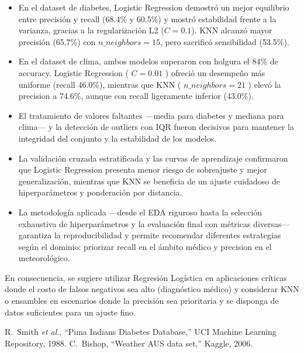 \documentclass[journal]{IEEEtran}
\begin{document}
\begin{itemize}
  \item En el dataset de diabetes, Logistic Regression demostró un mejor equilibrio entre precisión y recall (68.4\% y 60.5\%) y mostró estabilidad frente a la varianza, gracias a la regularización L2 (\(C=0.1\)). KNN alcanzó mayor precisión (65.7\%) con \(n\_neighbors=15\), pero sacrificó sensibilidad (53.5\%).
  \item En el dataset de clima, ambos modelos superaron con holgura el 84\% de accuracy. Logistic Regression ( \(C=0.01\) ) ofreció un desempeño más uniforme (recall 46.0\%), mientras que KNN ( \(n\_neighbors=21\) ) elevó la precision a 74.6\%, aunque con recall ligeramente inferior (43.0\%).
  \item El tratamiento de valores faltantes —media para diabetes y mediana para clima— y la detección de outliers con IQR fueron decisivos para mantener la integridad del conjunto y la estabilidad de los modelos.
  \item La validación cruzada estratificada y las curvas de aprendizaje confirmaron que Logistic Regression presenta menor riesgo de sobreajuste y mejor generalización, mientras que KNN se beneficia de un ajuste cuidadoso de hiperparámetros y ponderación por distancia.
  \item La metodología aplicada —desde el EDA riguroso hasta la selección exhaustiva de hiperparámetros y la evaluación final con métricas diversas— garantiza la reproducibilidad y permite recomendar diferentes estrategias según el dominio: priorizar recall en el ámbito médico y precision en el meteorológico.
\end{itemize}

En consecuencia, se sugiere utilizar Regresión Logística en aplicaciones críticas donde el costo de falsos negativos sea alto (diagnóstico médico) y considerar KNN o ensambles en escenarios donde la precisión sea prioritaria y se disponga de datos suficientes para un ajuste fino.


\begin{thebibliography}{1}
R.~Smith \emph{et al.}, ``Pima Indians Diabetes Database,'' UCI Machine Learning Repository, 1988.
C.~Bishop, ``Weather AUS data set,'' Kaggle, 2006.
\end{thebibliography}
\end{document}
